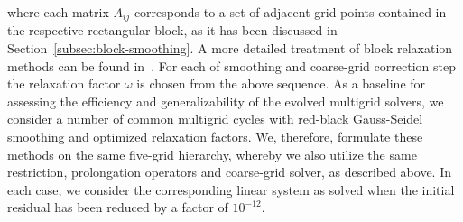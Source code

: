 where each matrix $A_{ij}$ corresponds to a set of adjacent grid points contained in the respective rectangular block, as it has been discussed in Section~\ref{subsec:block-smoothing}.
A more detailed treatment of block relaxation methods can be found in~\cite{trottenberg2000multigrid}.
For each of smoothing and coarse-grid correction step the relaxation factor $\omega$ is chosen from the above sequence.
As a baseline for assessing the efficiency and generalizability of the evolved multigrid solvers, we consider a number of common multigrid cycles with red-black Gauss-Seidel smoothing and optimized relaxation factors.
We, therefore, formulate these methods on the same five-grid hierarchy, whereby we also utilize the same restriction, prolongation operators and coarse-grid solver, as described above.
In each case, we consider the corresponding linear system as solved when the initial residual has been reduced by a factor of $10^{-12}$.
